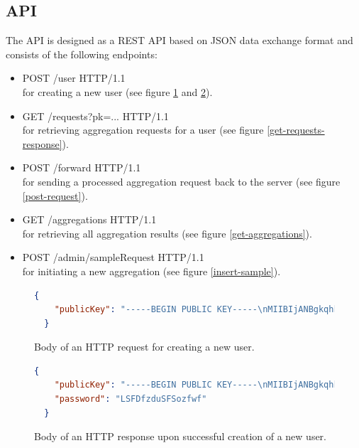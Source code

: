 \begin{samepage}
\section{API}\label{api}
The API is designed as a REST API based on JSON data exchange format and consists of the following endpoints:
\begin{itemize}
	\item POST /user HTTP/1.1
  \\for creating a new user (see figure \ref{post-user-request} and \ref{post-user-response}).

	\item GET /requests?pk=... HTTP/1.1
  \\for retrieving aggregation requests for a user (see figure \ref{get-requests-response}).

	\item POST /forward HTTP/1.1
  \\for sending a processed aggregation request back to the server (see figure \ref{post-request}).

	\item GET /aggregations HTTP/1.1
  \\for retrieving all aggregation results (see figure \ref{get-aggregations}).

	\item POST /admin/sampleRequest HTTP/1.1
  \\for initiating a new aggregation (see figure \ref{insert-sample}).
\end{itemize}
\end{samepage}

\begin{figure}[!h]
  \begin{lstlisting}[language=json,firstnumber=1]
  {
    "publicKey": "-----BEGIN PUBLIC KEY-----\nMIIBIjANBgkqhkiG..."
  }
  \end{lstlisting}
  \caption{Body of an HTTP request for creating a new user.}
  \label{post-user-request}
\end{figure}

\begin{figure}[h!]
  \begin{lstlisting}[language=json,firstnumber=1]
  {
    "publicKey": "-----BEGIN PUBLIC KEY-----\nMIIBIjANBgkqhkiG...",
    "password": "LSFDfzduSFSozfwf"
  }
  \end{lstlisting}
  \caption{Body of an HTTP response upon successful creation of a new user.}
  \label{post-user-response}
\end{figure}

